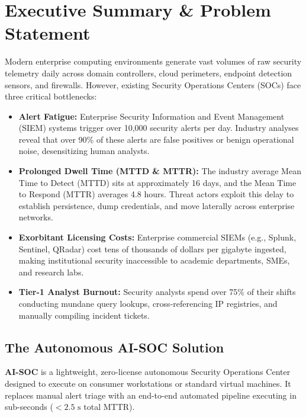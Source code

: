 \documentclass[11pt,a4paper]{article}
\begin{document}
\tableofcontents
\newpage

\section{Executive Summary \& Problem Statement}

Modern enterprise computing environments generate vast volumes of raw security telemetry daily across domain controllers, cloud perimeters, endpoint detection sensors, and firewalls. However, existing Security Operations Centers (SOCs) face three critical bottlenecks:

\begin{itemize}[leftmargin=1.5em]
    \item \textbf{Alert Fatigue:} Enterprise Security Information and Event Management (SIEM) systems trigger over 10,000 security alerts per day. Industry analyses reveal that over 90\% of these alerts are false positives or benign operational noise, desensitizing human analysts.
    \item \textbf{Prolonged Dwell Time (MTTD \& MTTR):} The industry average Mean Time to Detect (MTTD) sits at approximately 16 days, and the Mean Time to Respond (MTTR) averages 4.8 hours. Threat actors exploit this delay to establish persistence, dump credentials, and move laterally across enterprise networks.
    \item \textbf{Exorbitant Licensing Costs:} Enterprise commercial SIEMs (e.g., Splunk, Sentinel, QRadar) cost tens of thousands of dollars per gigabyte ingested, making institutional security inaccessible to academic departments, SMEs, and research labs.
    \item \textbf{Tier-1 Analyst Burnout:} Security analysts spend over 75\% of their shifts conducting mundane query lookups, cross-referencing IP registries, and manually compiling incident tickets.
\end{itemize}

\subsection{The Autonomous AI-SOC Solution}
\textbf{AI-SOC} is a lightweight, zero-license autonomous Security Operations Center designed to execute on consumer workstations or standard virtual machines. It replaces manual alert triage with an end-to-end automated pipeline executing in sub-seconds ($< 2.5\text{ s}$ total MTTR).
\end{document}
